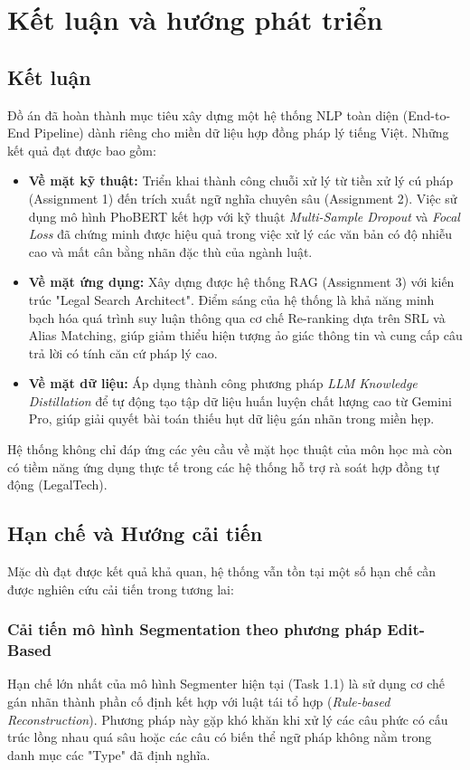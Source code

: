 \section{Kết luận và hướng phát triển}

\subsection{Kết luận}

Đồ án đã hoàn thành mục tiêu xây dựng một hệ thống NLP toàn diện (End-to-End Pipeline) dành riêng cho miền dữ liệu hợp đồng pháp lý tiếng Việt. Những kết quả đạt được bao gồm:
\begin{itemize}
    \item \textbf{Về mặt kỹ thuật:} Triển khai thành công chuỗi xử lý từ tiền xử lý cú pháp (Assignment 1) đến trích xuất ngữ nghĩa chuyên sâu (Assignment 2). Việc sử dụng mô hình PhoBERT kết hợp với kỹ thuật \textit{Multi-Sample Dropout} và \textit{Focal Loss} đã chứng minh được hiệu quả trong việc xử lý các văn bản có độ nhiễu cao và mất cân bằng nhãn đặc thù của ngành luật.
    \item \textbf{Về mặt ứng dụng:} Xây dựng được hệ thống RAG (Assignment 3) với kiến trúc "Legal Search Architect". Điểm sáng của hệ thống là khả năng minh bạch hóa quá trình suy luận thông qua cơ chế Re-ranking dựa trên SRL và Alias Matching, giúp giảm thiểu hiện tượng ảo giác thông tin và cung cấp câu trả lời có tính căn cứ pháp lý cao.
    \item \textbf{Về mặt dữ liệu:} Áp dụng thành công phương pháp \textit{LLM Knowledge Distillation} để tự động tạo tập dữ liệu huấn luyện chất lượng cao từ Gemini Pro, giúp giải quyết bài toán thiếu hụt dữ liệu gán nhãn trong miền hẹp.
\end{itemize}

Hệ thống không chỉ đáp ứng các yêu cầu về mặt học thuật của môn học mà còn có tiềm năng ứng dụng thực tế trong các hệ thống hỗ trợ rà soát hợp đồng tự động (LegalTech).

\subsection{Hạn chế và Hướng cải tiến}

Mặc dù đạt được kết quả khả quan, hệ thống vẫn tồn tại một số hạn chế cần được nghiên cứu cải tiến trong tương lai:

\subsubsection{Cải tiến mô hình Segmentation theo phương pháp Edit-Based}
Hạn chế lớn nhất của mô hình Segmenter hiện tại (Task 1.1) là sử dụng cơ chế gán nhãn thành phần cố định kết hợp với luật tái tổ hợp (\textit{Rule-based Reconstruction}). Phương pháp này gặp khó khăn khi xử lý các câu phức có cấu trúc lồng nhau quá sâu hoặc các câu có biến thể ngữ pháp không nằm trong danh mục các "Type" đã định nghĩa.

